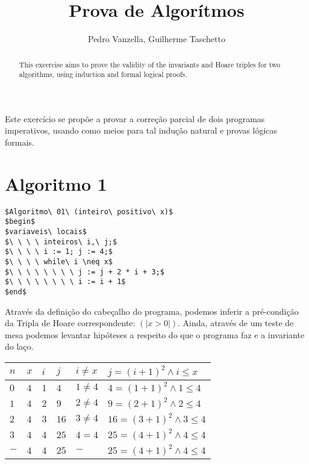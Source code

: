 \documentclass[12pt]{article}
\title{Prova de Algorítmos}
\author{Pedro Vanzella\inst{1}, Guilherme Taschetto\inst{1}}
\begin{document}
\maketitle

\begin{abstract}
    This excercise aims to prove the validity of the invariants and Hoare
    triples for two algorithms, using induction and formal logical proofs.
\end{abstract}

\begin{resumo}
    Este exercício se propõe a provar a correção parcial de dois programas
    imperativos, usando como meios para tal indução natural e provas lógicas formais.
\end{resumo}

\section{Algoritmo 1}\label{sec:algo1}
\begin{lstlisting}
$Algoritmo\ 01\ (inteiro\ positivo\ x)$
$begin$
$variaveis\ locais$
$\ \ \ \ inteiros\ i,\ j;$
$\ \ \ \ i := 1; j := 4;$
$\ \ \ \ while\ i \neq x$
$\ \ \ \ \ \ \ \ j := j + 2 * i + 3;$
$\ \ \ \ \ \ \ \ i := i + 1$
$end$
\end{lstlisting}

Através da definição do cabeçalho do programa, podemos inferir a pré-condição da Tripla de Hoare correspondente: $(| x > 0 |)$. Ainda, através de um teste de
mesa podemos levantar hipóteses a respeito do que o programa faz e a invariante do laço.

\begin{table}[h]
\begin{tabular}{|l|l|l|l|l|l|}
\hline
$n$ & $x$ & $i$ & $j $ & $i \neq x$ & $j=(i+1)^2 \land i \leq x $ \\ \hline
$0$ & $4$ & $1$ & $4 $ & $1 \neq 4$ & $4=(1+1)^2 \land 1 \leq 4 $ \\ \hline
$1$ & $4$ & $2$ & $9 $ & $2 \neq 4$ & $9=(2+1)^2 \land 2 \leq 4 $ \\ \hline
$2$ & $4$ & $3$ & $16$ & $3 \neq 4$ & $16=(3+1)^2 \land 3 \leq 4$ \\ \hline
$3$ & $4$ & $4$ & $25$ & $4 = 4   $ & $25=(4+1)^2 \land 4 \leq 4$ \\ \hline
$-$ & $4$ & $4$ & $25$ & $-       $ & $25=(4+1)^2 \land 4 \leq 4$ \\ \hline
\end{tabular}
\end{table}
\end{document}
